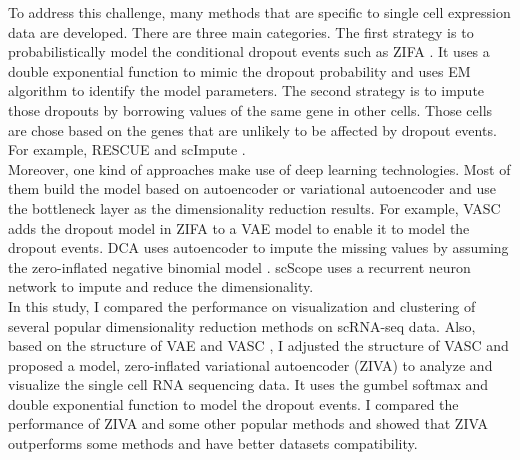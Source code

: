To address this challenge, many methods that are specific to single cell expression data are developed. There are three main categories. The first strategy is to probabilistically model the conditional dropout events such as ZIFA \cite{Pierson2015}. It uses a double exponential function to mimic the dropout probability and uses EM algorithm \cite{mclachlan2007algorithm} to identify the model parameters.
The second strategy is to impute those dropouts by borrowing values of the same gene in other cells. Those cells are chose based on the genes that are unlikely to be affected by dropout events. For example, RESCUE \cite{Tracy2019} and scImpute \cite{Li2018}. \\
Moreover, one kind of approaches make use of deep learning technologies. Most of them build the model based on autoencoder or variational autoencoder and use the bottleneck layer as the dimensionality reduction results. For example, VASC \cite{Wang2018} adds the dropout model in ZIFA to a VAE model to enable it to model the dropout events. DCA \cite{Eraslan2019a} uses autoencoder to impute the missing values by assuming the zero-inflated negative binomial model \cite{Hafemeister2019}. scScope \cite{Deng2019} uses a recurrent neuron network to impute and reduce the dimensionality. \\
In this study, I compared the performance on visualization and clustering of several popular dimensionality reduction methods on scRNA-seq data. Also, based on the structure of VAE \cite{Kingma2014} and VASC \cite{Wang2018}, I adjusted the structure of VASC and proposed a model, zero-inflated variational autoencoder (ZIVA) to analyze and visualize the single cell RNA sequencing data. It uses the gumbel softmax and double exponential function to model the dropout events. I compared the performance of ZIVA and some other popular methods and showed that ZIVA outperforms some methods and have better datasets compatibility.

